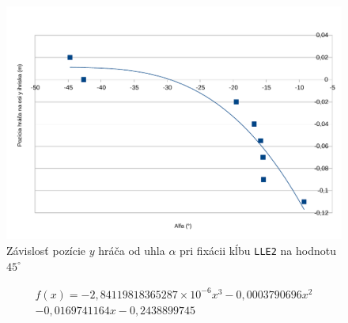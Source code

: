 \begin{figure}[H]
	\centering
	\includegraphics[scale=0.7]{./data/fixed_LLE2_45_dependency_to_shift_left}
	\caption{Závislosť pozície $y$ hráča od uhla $\alpha$ pri fixácii kĺbu \texttt{LLE2} na hodnotu $45^{\circ}$}
	\label{pic_lle2_45_y_shift}
\end{figure}

\begin{eqnarray} \label{eq_lle2_45_y_shift}
f(x) =  -2,84119818365287\times 10^{-6}x^3 - 0,0003790696x^2 \\\nonumber
- 0,0169741164x - 0,2438899745
\end{eqnarray}

